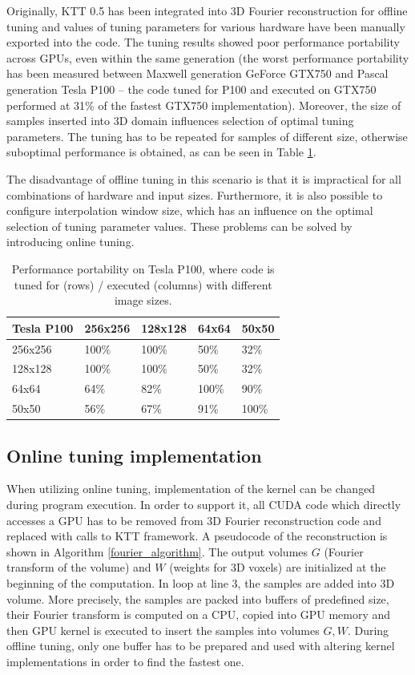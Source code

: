 \documentclass
[
    digital, %
    oneside, %
    table, %
    nolof, %
    nolot, %
    nocover %
]{fithesis3}
\begin{document}
Originally, KTT 0.5 has been integrated into 3D Fourier reconstruction for offline tuning and values of tuning parameters for various hardware have
been manually exported into the code. The tuning results showed poor performance portability across GPUs, even within the same generation (the worst
performance portability has been measured between Maxwell generation GeForce GTX750 and Pascal generation Tesla P100 -- the code tuned for P100 and
executed on GTX750 performed at 31\% of the fastest GTX750 implementation). Moreover, the size of samples inserted into 3D domain influences selection
of optimal tuning parameters. The tuning has to be repeated for samples of different size, otherwise suboptimal performance is obtained, as can be seen in
Table \ref{fourier_portability}.

The disadvantage of offline tuning in this scenario is that it is impractical for all combinations of hardware and input sizes. Furthermore, it is also
possible to configure interpolation window size, which has an influence on the optimal selection of tuning parameter values. These problems can be solved
by introducing online tuning.

\begin{table}
\begin{center}
    \begin{tabular}{|l|l|l|l|l|}
    \hline
    Tesla P100 & 256x256 & 128x128 & 64x64 & 50x50 \\
    \hline
    256x256 & 100\% & 100\% & 50\% & 32\% \\
    128x128 & 100\% & 100\% & 50\% & 32\% \\
    64x64 & 64\% & 82\% & 100\% & 90\% \\
    50x50 & 56\% & 67\% & 91\% & 100\% \\
    \hline
    \end{tabular}
\end{center}
\caption{Performance portability on Tesla P100, where code is tuned for (rows) / executed (columns) with different image sizes.}
\label{fourier_portability}
\end{table}

\subsection{Online tuning implementation}
When utilizing online tuning, implementation of the kernel can be changed during program execution. In order to support it, all CUDA code which directly
accesses a GPU has to be removed from 3D Fourier reconstruction code and replaced with calls to KTT framework. A pseudocode of the reconstruction is shown
in Algorithm \ref{fourier_algorithm}. The output volumes $G$ (Fourier transform of the volume) and $W$ (weights for 3D voxels) are initialized at the
beginning of the computation. In loop at line 3, the samples are added into 3D volume. More precisely, the samples are packed
into buffers of predefined size, their Fourier transform is computed on a CPU, copied into GPU memory and then GPU kernel is executed to insert the
samples into volumes $G, W$. During offline tuning, only one buffer has to be prepared and used with altering kernel implementations in order to find the
fastest one.
\end{document}
